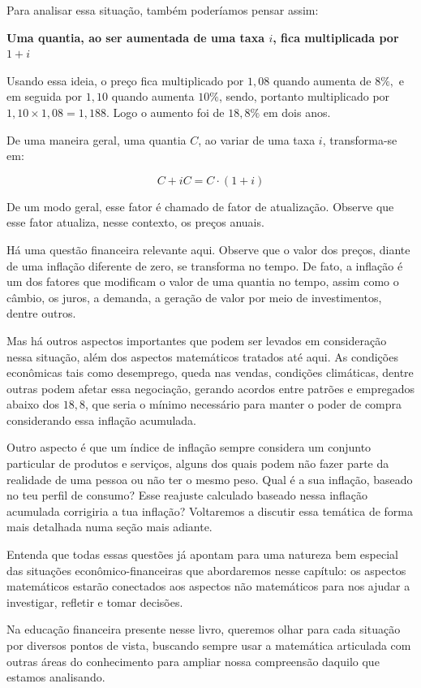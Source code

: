 Para analisar essa situação, também poderíamos pensar assim: 

\begin{center}
\textbf{Uma quantia, ao ser aumentada de uma taxa $i$, fica multiplicada por $1+i$}
\end{center}

Usando essa ideia, o preço fica multiplicado por $1{,}08$ quando aumenta de $8\%,$ e em seguida por $1{,}10$ quando aumenta $10\%$, sendo, portanto multiplicado por $1{,}10\times1{,}08 = 1{,}188$. Logo o aumento foi de $18{,}8\%$ em dois anos.

De uma maneira geral, uma quantia $C$, ao variar de uma taxa $i$, transforma-se em:

$$ C+iC=C\cdot(1+i) $$


De um modo geral, esse fator é chamado de fator de atualização. Observe que esse fator atualiza, nesse contexto, os preços anuais.

Há uma questão financeira relevante aqui. Observe que o valor dos preços, diante de uma inflação diferente de zero, se transforma no tempo. De fato, a inflação é um dos fatores que modificam o valor de uma quantia no tempo, assim como o câmbio, os juros, a demanda, a geração de valor por meio de investimentos, dentre outros.

Mas há outros aspectos importantes que podem ser levados em consideração nessa situação, além dos aspectos matemáticos tratados até aqui. As condições econômicas tais como desemprego, queda nas vendas, condições climáticas, dentre outras podem afetar essa negociação, gerando acordos entre patrões e empregados abaixo dos $18,8$, que seria o mínimo necessário para manter o poder de compra considerando essa inflação acumulada.

Outro aspecto é que um índice de inflação sempre considera um conjunto particular de produtos e serviços, alguns dos quais podem não fazer parte da realidade de uma pessoa ou não ter o mesmo peso. Qual é a sua inflação, baseado no teu perfil de consumo? Esse reajuste calculado baseado nessa inflação acumulada corrigiria a tua inflação? Voltaremos a discutir essa temática de forma mais detalhada numa seção mais adiante.

Entenda que todas essas questões já apontam para uma natureza bem especial das situações econômico-financeiras que abordaremos nesse capítulo: os aspectos matemáticos estarão conectados aos aspectos não matemáticos para nos ajudar a investigar, refletir e tomar decisões. 

Na educação financeira presente nesse livro, queremos olhar para cada situação por diversos pontos de vista, buscando sempre usar a matemática articulada com outras áreas do conhecimento para ampliar nossa compreensão daquilo que estamos analisando.

